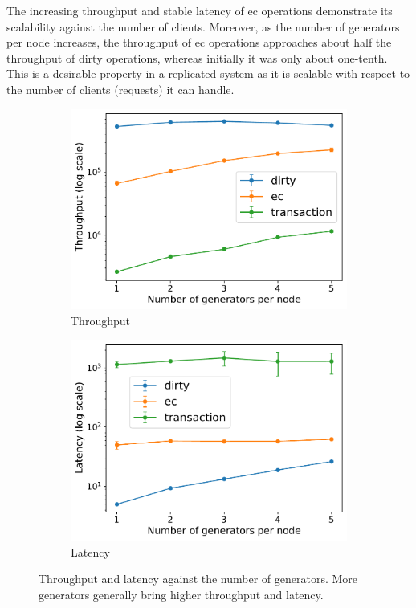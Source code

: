 The increasing throughput and stable latency of \acrshort{ec} operations demonstrate
its scalability against the number of clients. Moreover, as the number of
generators per node increases, the throughput of \acrshort{ec} operations
approaches about half the throughput of dirty operations, whereas initially it was
only about one-tenth. This is a desirable property in a replicated system as
it is scalable with respect to the number of clients (requests) it can handle.

\begin{figure}[htp]
  \centering
  \begin{subfigure}[t]{0.95\columnwidth}
    \centering
    \includegraphics[width=\columnwidth]{figures/tp_generators_caelum.pdf}
    \caption{Throughput}
    \label{fig:tp generators caelum}
  \end{subfigure}
  
  \begin{subfigure}[t]{0.95\columnwidth}
    \centering
    \includegraphics[width=\columnwidth]{figures/lat_generators_caelum.pdf}
    \caption{Latency}
    \label{fig:lat generators caelum}
  \end{subfigure}
  \caption{Throughput and latency against the number of generators. More generators
  generally bring higher throughput and latency.}
  \label{fig:generators caelum}
\end{figure}


